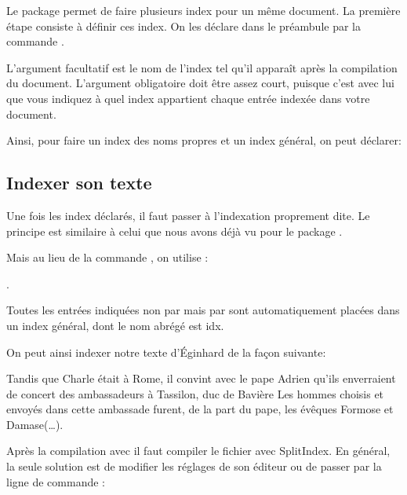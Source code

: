 Le package  permet de faire plusieurs index pour un même document. La première étape consiste à définir ces index. On les déclare dans le préambule par la commande .


L'argument facultatif est le nom de l'index tel qu'il apparaît après la compilation du document. L'argument obligatoire doit être assez court, puisque c'est avec lui que vous indiquez à quel index appartient chaque entrée indexée dans votre document.


Ainsi, pour faire un index des noms propres et un index général, on peut déclarer:

\begin{latexcode}
\end{latexcode}

\subsection{Indexer son texte}
Une fois  les index déclarés, il faut passer à l'indexation proprement dite. Le principe est similaire à celui que nous avons déjà vu pour le package .

Mais au lieu de la commande , on utilise :

. 

\begin{plusloins}

Toutes les entrées indiquées non par  mais par  sont automatiquement placées dans un index général, dont le nom abrégé est idx.

\end{plusloins}
On peut ainsi indexer notre texte d'Éginhard de la façon suivante:

\begin{latexcode}
Tandis que Charle était à Rome, il convint
avec le pape Adrien qu’ils enverraient de concert
des ambassadeurs à Tassilon, duc de Bavière
\textelp{}
Les hommes choisis et envoyés dans cette ambassade furent, de 
la part du pape, les évêques Formose et 
Damase(…).
\end{latexcode}

Après la compilation avec \XeLaTeX il faut compiler le fichier  avec SplitIndex. En général, la seule solution est de modifier les réglages de son éditeur ou de  passer par la ligne de commande  :

